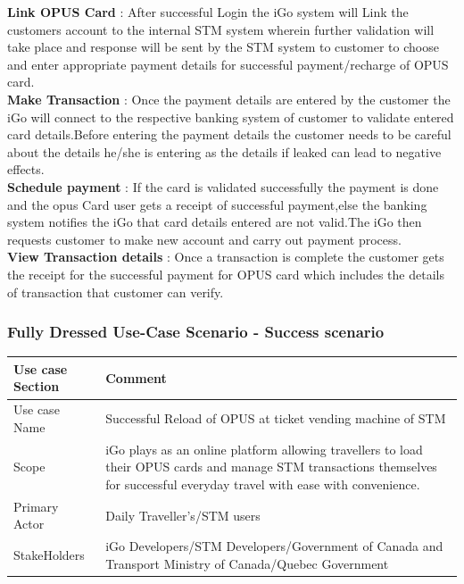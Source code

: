 \documentclass[11pt, english]{report}
\begin{document}
\textbf{Link OPUS Card} : After successful Login the iGo system will Link the customers account to the internal STM system wherein further validation will take place and response will be sent by the STM system to customer to choose and enter appropriate payment details for successful payment/recharge of OPUS card.\\ 

\textbf{Make Transaction }: 
Once the payment details are entered by the customer the iGo will connect to the respective banking system of customer to validate entered card details.Before entering the payment details the customer needs to be careful about the details he/she is entering as the details if leaked can lead to negative effects.\\  

\textbf{Schedule payment} : 
If the card is validated successfully the payment is done and the opus Card user gets a receipt of successful payment,else the banking system notifies the iGo  that card details entered are not valid.The iGo then requests customer to make new account and carry out payment process.\\ 

\textbf{View Transaction details} : 
Once a transaction is complete the customer gets the receipt for the successful payment for OPUS card which includes the details of transaction that customer can verify. \\

\subsubsection{Fully Dressed Use-Case Scenario - Success scenario}
\vspace*{0.1in}
\setlength{\tabcolsep}{18pt}
\renewcommand{\arraystretch}{1.5}
\begin{tabular}{ |p{4cm}|p{10cm}|}
\hline
Use case Section & Comment\\
\hline

Use case Name & Successful Reload of OPUS at ticket vending machine of STM\\
\hline

Scope &
 iGo plays as an online platform allowing travellers to load  their  OPUS  cards  and  manage  STM  transactions  themselves for successful everyday travel with ease with convenience. \\
\hline
Primary Actor & Daily Traveller's/STM users \\
\hline
StakeHolders & iGo Developers/STM Developers/Government of Canada and Transport Ministry of Canada/Quebec Government \\
\hline

\end{tabular}
\end{document}
